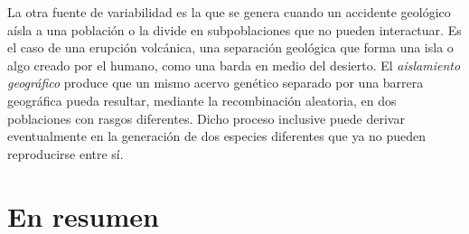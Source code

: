 \documentclass[
  letterpaper,
]{book}
\begin{document}
La otra fuente de variabilidad es la que se genera cuando un accidente
geológico aísla a una población o la divide en subpoblaciones que no
pueden interactuar. Es el caso de una erupción volcánica, una separación
geológica que forma una isla o algo creado por el humano, como una barda
en medio del desierto. El \emph{aislamiento geográfico} produce que un
mismo acervo genético separado por una barrera geográfica pueda
resultar, mediante la recombinación aleatoria, en dos poblaciones con
rasgos diferentes. Dicho proceso inclusive puede derivar eventualmente
en la generación de dos especies diferentes que ya no pueden
reproducirse entre sí.

\section{En resumen}\label{en-resumen}
\end{document}
